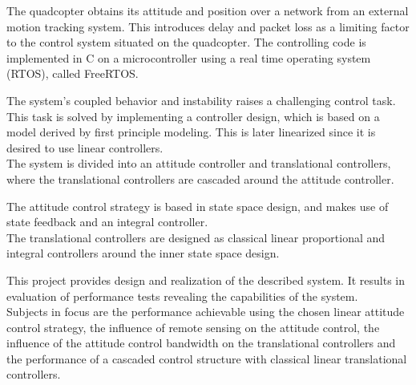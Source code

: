 The quadcopter obtains its attitude and position over a network from an external motion tracking system. This introduces delay and packet loss as a limiting factor to the control system situated on the quadcopter. The controlling code is implemented in C on a microcontroller using a real time operating system (RTOS), called FreeRTOS.

The system's coupled behavior and instability raises a challenging control task. This task is solved by implementing a controller design, which is based on a model derived by first principle modeling. This is later linearized since it is desired to use linear controllers.\\
The system is divided into an attitude controller and translational controllers, where the translational controllers are cascaded around the attitude controller.

The attitude control strategy is based in state space design, and makes use of state feedback and an integral controller.\\
The translational controllers are designed as classical linear proportional and integral controllers around the inner state space design.

This project provides design and realization of the described system. It results in evaluation of performance tests revealing the capabilities of the system.\\
Subjects in focus are the performance achievable using the chosen linear attitude control strategy, the influence of remote sensing on the attitude control, the influence of the attitude control bandwidth on the translational controllers and the performance of a cascaded control structure with classical linear translational controllers.